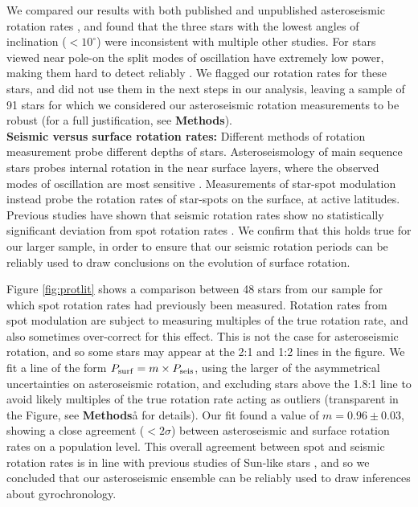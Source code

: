 \documentclass[12pt]{article}
\begin{document}
We compared our results with both published and unpublished asteroseismic rotation rates \cite{nielsen+2015,davies+2015,davies+2016, lund+2017, benomar+2018}, and found that the three stars with the lowest angles of inclination ($< 10^\circ$) were inconsistent with multiple other studies. For stars viewed near pole-on the split modes of oscillation have extremely low power, making them hard to detect reliably \cite{lund+2014}. We flagged our rotation rates for these stars, and did not use them in the next steps in our analysis, leaving a sample of 91 stars for which we considered our asteroseismic rotation measurements to be robust (for a full justification, see \textbf{Methods}).\\

\textbf{Seismic versus surface rotation rates:} Different methods of rotation measurement probe different depths of stars. Asteroseismology of main sequence stars probes internal rotation in the near surface layers, where the observed modes of oscillation are most sensitive \cite{lund+2014}. Measurements of star-spot modulation instead probe the rotation rates of star-spots on the surface, at active latitudes. Previous studies have shown that seismic rotation rates show no statistically significant deviation from spot rotation rates \cite{nielsen+2015, benomar+2015}. We confirm that this holds true for our larger sample, in order to ensure that our seismic rotation periods can be reliably used to draw conclusions on the evolution of surface rotation.

Figure \ref{fig:protlit} shows a comparison between 48 stars from our sample for which spot  rotation rates had previously been measured. Rotation rates from spot modulation are subject to measuring multiples of the true rotation rate, and also sometimes over-correct for this effect. This is not the case for asteroseismic rotation, and so some stars may appear at the 2:1 and 1:2 lines in the figure. We fit a line of the form $P_{\rm surf} = m \times P_{\rm seis}$, using the larger of the asymmetrical uncertainties on asteroseismic rotation, and excluding stars above the 1.8:1 line to avoid likely multiples of the true rotation rate acting as outliers (transparent in the Figure, see \textbf{Methods}å for details). Our fit found a value of $m = 0.96 \pm 0.03$, showing a close agreement ($<2\sigma$) between asteroseismic and surface rotation rates on a population level. This overall agreement between spot and seismic rotation rates is in line with previous studies of Sun-like stars \cite{nielsen+2015, benomar+2015, gizon+2013, chaplin+2013}, and so we concluded that our asteroseismic ensemble can be reliably used to draw inferences about gyrochronology.\\
\end{document}

